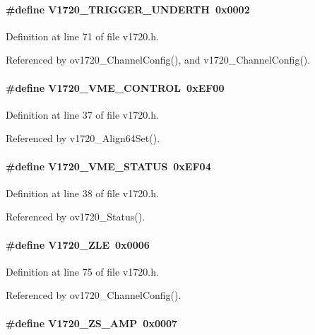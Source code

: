 \paragraph[{V1720\_\-TRIGGER\_\-UNDERTH}]{\setlength{\rightskip}{0pt plus 5cm}\#define V1720\_\-TRIGGER\_\-UNDERTH~0x0002}\hfill\label{v1720_8h_a63d7b46ce5af2377d4bbdfead7be9826}


Definition at line 71 of file v1720.h.

Referenced by ov1720\_\-ChannelConfig(), and v1720\_\-ChannelConfig().
\paragraph[{V1720\_\-VME\_\-CONTROL}]{\setlength{\rightskip}{0pt plus 5cm}\#define V1720\_\-VME\_\-CONTROL~0xEF00}\hfill\label{v1720_8h_aae1e3b9b933d4634d303a64ac1a30571}


Definition at line 37 of file v1720.h.

Referenced by v1720\_\-Align64Set().
\paragraph[{V1720\_\-VME\_\-STATUS}]{\setlength{\rightskip}{0pt plus 5cm}\#define V1720\_\-VME\_\-STATUS~0xEF04}\hfill\label{v1720_8h_ac47758658a3dc6a4dabb2e5e3c20417a}


Definition at line 38 of file v1720.h.

Referenced by ov1720\_\-Status().
\paragraph[{V1720\_\-ZLE}]{\setlength{\rightskip}{0pt plus 5cm}\#define V1720\_\-ZLE~0x0006}\hfill\label{v1720_8h_a94dcfb65ef87c9932e8acf1c9e16c019}


Definition at line 75 of file v1720.h.

Referenced by ov1720\_\-ChannelConfig().
\paragraph[{V1720\_\-ZS\_\-AMP}]{\setlength{\rightskip}{0pt plus 5cm}\#define V1720\_\-ZS\_\-AMP~0x0007}\hfill\label{v1720_8h_ac1647b2aa65ec702ed3b2f37e4fcae72}



